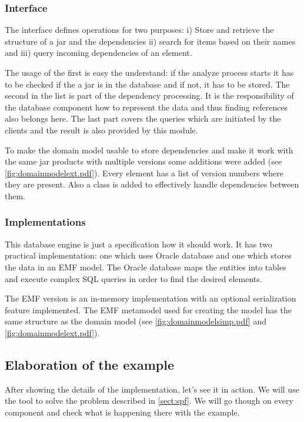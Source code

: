 \subsubsection{Interface}
The interface defines operations for two purposes: i) Store and retrieve the
structure of a jar and the dependencies ii) search for items based on their
names and iii) query incoming dependencies of an element.

The usage of the first is easy the understand: if the analyze process starts it
has to be checked if the a jar is in the database and if not, it has to be
stored. The second in the list is part of the dependency processing. It is the
responsibility of the database component how to represent the data and thus
finding references also belongs here. The last part covers the queries which are
initiated by the clients and the result is also provided by this module.

To make the domain model usable to store dependencies and make it work with the
same jar products with multiple versions some additions were added (see
\autoref{fig:domainmodelext.pdf}).  Every element has a list of version numbers where they are
present. Also a  class is added to effectively handle
dependencies between them.

\subsubsection{Implementations}
This database engine is just a specification how it should work. It has two
practical implementation: one which uses Oracle database and one which stores
the data in an EMF model. The Oracle database maps the entities into tables and
execute complex SQL queries in order to find the desired elements.

The EMF version is an in-memory implementation with an optional serialization
feature implemented. The EMF metamodel used for creating the model has the same
structure as the domain model (see \autoref{fig:domainmodelsimp.pdf} and
\autoref{fig:domainmodelext.pdf}).



\subsection{Elaboration of the example}
After showing the details of the implementation, let's see it in action.
We will use the tool to solve the problem described in \autoref{sect:spf}. We
will go though on every component and check what is happening there with the
example. 

